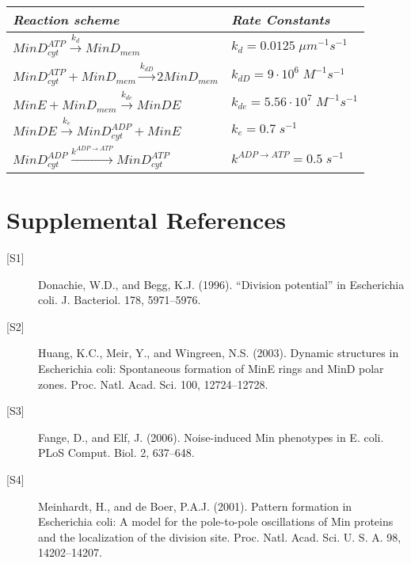 \documentclass[]{article}
\def\itemnb[#1]#2{\item[{\rm #1}]#2}
\begin{document}
\hfill



\hfill

\begin{minipage}{\linewidth}
	\centering
\begin{tabular}[center]{p{8.5cm} p{8.5cm}}
\textit{Reaction scheme}	&	\textit{Rate Constants}	\\
\hline
\(MinD_{cyt}^{ATP}\mathop  \to \limits^{{k_d}} Min{D_{mem}}\)	&		\({k_d} = 0.0125\;\mu {m^{ - 1}}{s^{ - 1}}\)	\\
\hline
\(MinD_{cyt}^{ATP} + Min{D_{mem}}\mathop  \to \limits^{{k_{dD}}} 2Min{D_{mem}}\)	&		\({k_{dD}} = 9\cdot{10^6}\;{M^{ - 1}}{s^{ - 1}}\) \\
\hline
\(MinE + Min{D_{mem}}\mathop  \to \limits^{{k_{de}}} MinDE\)	&	\({k_{de}} = 5.56\cdot{10^7}\;{M^{ - 1}}{s^{ - 1}}\)	\\
\hline
\(MinDE\mathop  \to \limits^{{k_e}} MinD_{cyt}^{ADP} + MinE\)	&		\({k_e} = 0.7\;{s^{ - 1}}\)	\\
\hline
\(MinD_{cyt}^{ADP}\mathop  \to \limits^{{k^{ADP \to ATP}}} MinD_{cyt}^{ATP}\)	&		\({k^{ADP \to ATP}} = 0.5\;{s^{ - 1}}\)	\\
\hline
\end{tabular}
\end{minipage}



\section*{Supplemental References}

\begin{description}
	\itemnb[{[S1]}] 
	Donachie, W.D., and Begg, K.J. (1996). “Division potential” in Escherichia coli. J. Bacteriol. 178, 5971–5976.
	
	\itemnb[{[S2]}]
	Huang, K.C., Meir, Y., and Wingreen, N.S. (2003). Dynamic structures in Escherichia coli: Spontaneous formation of MinE rings and MinD polar zones. Proc. Natl. Acad. Sci. 100, 12724–12728.
	
	\itemnb[{[S3]}]
	Fange, D., and Elf, J. (2006). Noise-induced Min phenotypes in E. coli. PLoS Comput. Biol. 2, 637–648.
	
	\itemnb[{[S4]}] 
	Meinhardt, H., and de Boer, P.A.J. (2001). Pattern formation in Escherichia coli: A model for the pole-to-pole oscillations of Min proteins and the localization of the division site. Proc. Natl. Acad. Sci. U. S. A. 98, 14202–14207.
	
\end{description}

%
%
\end{document}
